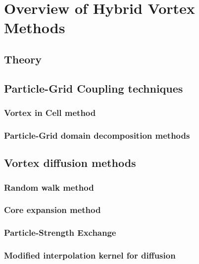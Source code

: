 \chapter{Overview of Hybrid Vortex Methods}


\section{Theory}

\section{Particle-Grid Coupling techniques}
\subsection{Vortex in Cell method}

\subsection{Particle-Grid domain decomposition methods}

\section{Vortex diffusion methods}

\subsection{Random walk method}
\subsection{Core expansion method}
\subsection{Particle-Strength Exchange}
\subsection{Modified interpolation kernel for diffusion}

